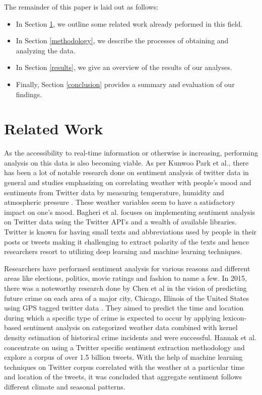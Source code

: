 \documentclass[a4paper,10pt]{article}
\begin{document}
    The remainder of this paper is laid out as follows:
    \begin{itemize}
        \item{In Section \ref{related_work}, we outline some related work already peformed in this field.}
        \item{In Section \ref{methodology}, we describe the processes of obtaining and analyzing the data.}
        \item{In Section \ref{results}, we give an overview of the results of our analyses.}
        \item{Finally, Section \ref{conclusion} provides a summary and evaluation of our findings.}
    \end{itemize}


    \section{Related Work}
    \label{related_work}

    As the accessibility to real-time information or otherwise is increasing, performing analysis on this data is also becoming viable. As per Kunwoo Park et al., there has been a lot of notable research done on sentiment analysis of twitter data in general and studies emphasizing on correlating weather with people’s mood and sentiments from Twitter data by measuring temperature, humidity and atmospheric pressure . These weather variables seem to have a satisfactory impact on one’s mood. Bagheri et al.  focuses on implementing sentiment analysis on Twitter data using the Twitter API’s and a wealth of available libraries. Twitter is known for having small texts and abbreviations used by people in their posts or tweets making it challenging to extract polarity of the texts and hence researchers resort to utilizing deep learning and machine learning techniques.
    
    Researchers have performed sentiment analysis for various reasons and different areas like elections, politics, movie ratings and fashion to name a few. In 2015, there was a noteworthy research done by Chen et al in the vision of predicting future crime on each area of a major city, Chicago, Illinois of the United States using GPS tagged twitter data . They aimed to predict the time and location during which a specific type of crime is expected to occur by applying lexicon-based sentiment analysis on categorized weather data combined with kernel density estimation of historical crime incidents and were successful. Hannak et al.  concentrate on using a Twitter specific sentiment extraction methodology and explore a corpus of over 1.5 billion tweets. With the help of machine learning techniques on Twitter corpus correlated with the weather at a particular time and location of the tweets, it was concluded that aggregate sentiment follows different climate and seasonal patterns.
\end{document}
